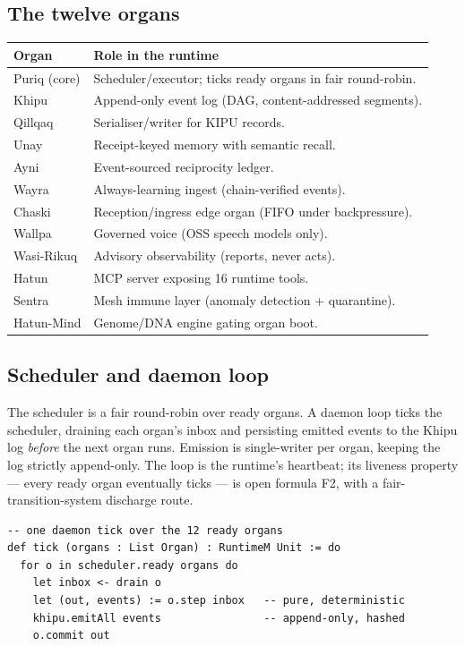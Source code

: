 \documentclass[11pt]{article}
\theoremstyle{plain}
\theoremstyle{definition}
\theoremstyle{remark}
\begin{document}
\subsection{The twelve organs}
\begin{center}
\begin{tabular}{@{}ll@{}}
\toprule
\textbf{Organ} & \textbf{Role in the runtime}\\
\midrule
Puriq (core) & Scheduler/executor; ticks ready organs in fair round-robin.\\
Khipu & Append-only event log (DAG, content-addressed segments).\\
Qillqaq & Serialiser/writer for KIPU records.\\
Unay & Receipt-keyed memory with semantic recall.\\
Ayni & Event-sourced reciprocity ledger.\\
Wayra & Always-learning ingest (chain-verified events).\\
Chaski & Reception/ingress edge organ (FIFO under backpressure).\\
Wallpa & Governed voice (OSS speech models only).\\
Wasi-Rikuq & Advisory observability (reports, never acts).\\
Hatun & MCP server exposing 16 runtime tools.\\
Sentra & Mesh immune layer (anomaly detection + quarantine).\\
Hatun-Mind & Genome/DNA engine gating organ boot.\\
\bottomrule
\end{tabular}
\end{center}

\subsection{Scheduler and daemon loop}
The scheduler is a fair round-robin over ready organs. A daemon loop ticks the scheduler,
draining each organ's inbox and persisting emitted events to the Khipu log \emph{before}
the next organ runs. Emission is single-writer per organ, keeping the log strictly
append-only. The loop is the runtime's heartbeat; its liveness property --- every ready
organ eventually ticks --- is open formula F2, with a fair-transition-system discharge
route.

\begin{lstlisting}
-- one daemon tick over the 12 ready organs
def tick (organs : List Organ) : RuntimeM Unit := do
  for o in scheduler.ready organs do
    let inbox <- drain o
    let (out, events) := o.step inbox   -- pure, deterministic
    khipu.emitAll events                -- append-only, hashed
    o.commit out
\end{lstlisting}
\end{document}
